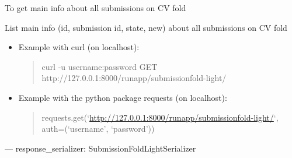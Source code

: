 \documentclass[letterpaper,10pt,english]{sphinxmanual}
\begin{document}
\begin{fulllineitems}
\label{modules/views:runapp.views.SubmissionFoldLightList}
To get main info about all submissions on CV fold

\begin{fulllineitems}
\label{modules/views:runapp.views.SubmissionFoldLightList.get}
List main info (id, submission id, state, new) about all submissions        on CV fold
\begin{itemize}
\item {} 
Example with curl (on localhost):
\begin{quote}

curl -u username:password GET            http://127.0.0.1:8000/runapp/submissionfold-light/
\end{quote}

\item {} 
Example with the python package requests (on localhost):
\begin{quote}

requests.get(`\url{http://127.0.0.1:8000/runapp/submissionfold-light/}`,            auth=(`username', `password'))
\end{quote}

\end{itemize}

---
response\_serializer: SubmissionFoldLightSerializer

\end{fulllineitems}


\end{fulllineitems}

\end{document}
